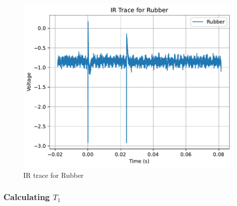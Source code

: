 \documentclass{article}
\begin{document}
\begin{itemize}
    \begin{figure}[h!]
        \centering
        \includegraphics[scale = 0.57]{../images/B3_Rubber}
        \caption{IR trace for Rubber}
        \label{fig:B3_Rubber}
    \end{figure}
\end{itemize}

\subsubsection{Calculating $T_1$}
\end{document}

